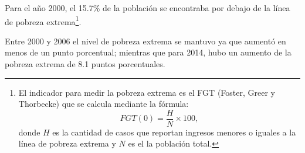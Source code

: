 Para el año 2000, el 15.7\% de la población se encontraba por debajo de la línea de pobreza extrema\footnote{El indicador para medir la pobreza extrema es el FGT (Foster, Greer y Thorbecke) que se calcula mediante la fórmula: \[ FGT(0)  = \frac{H}{N}\times 100,  \] donde $H$  es la cantidad de casos que reportan ingresos menores o iguales a la línea de pobreza extrema y $N$ es el la población total.}. 

Entre 2000 y 2006  el nivel de pobreza extrema se mantuvo ya que aumentó en menos de un punto porcentual; mientras que para 2014, hubo un aumento de la pobreza extrema de 8.1 puntos porcentuales.